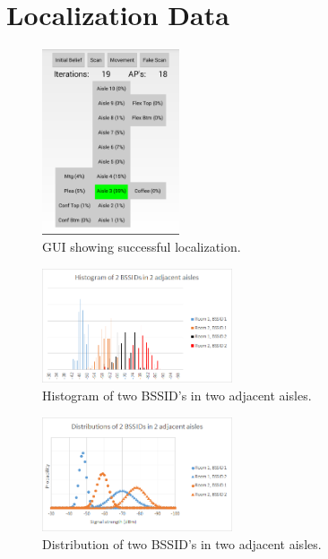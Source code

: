 \documentclass[a4paper,10pt,twoside]{IEEEtran}
\begin{document}
%
%

\newpage
\appendix

%
\section{Localization Data}

\begin{figure}[h!]
  \centering
    \includegraphics[width=0.36\textwidth]{screenshot}
    \caption{GUI showing successful localization.}
    \label{fig:screenshot}
\end{figure}

\begin{figure}[h!]
  \centering
    \includegraphics[width=0.5\textwidth]{histogram}
    \caption{Histogram of two BSSID's in two adjacent aisles.}
    \label{fig:histogram}
\end{figure}

\begin{figure}[h!]
  \centering
    \includegraphics[width=0.5\textwidth]{distribution}
    \caption{Distribution of two BSSID's in two adjacent aisles.}
    \label{fig:distribution}
\end{figure}
\end{document}
